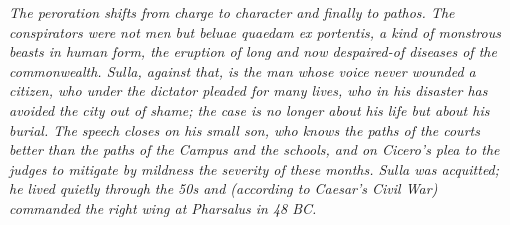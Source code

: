 \textit{The peroration shifts from charge to character and
finally to pathos. The conspirators were not men but
\textit{beluae quaedam ex portentis}, a kind of monstrous
beasts in human form, the eruption of long and now
despaired-of diseases of the commonwealth. Sulla, against
that, is the man whose voice never wounded a citizen, who
under the dictator pleaded for many lives, who in his
disaster has avoided the city out of shame; the case is no
longer about his life but about his burial. The speech
closes on his small son, who knows the paths of the
courts better than the paths of the Campus and the schools,
and on Cicero's plea to the judges to mitigate by mildness
the severity of these months. Sulla was acquitted; he lived
quietly through the 50s and (according to Caesar's
\textit{Civil War}) commanded the right wing at Pharsalus
in 48 BC.}
